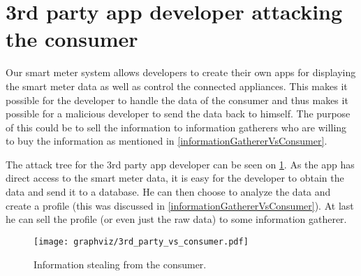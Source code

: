 \section{3rd party app developer attacking the consumer}
Our smart meter system allows developers to create their own apps for displaying the smart meter data as well as control the connected appliances.
This makes it possible for the developer to handle the data of the consumer and thus makes it possible for a malicious developer to send the data back to himself.
The purpose of this could be to sell the information to information gatherers who are willing to buy the information as mentioned in \cref{informationGathererVsConsumer}.

The attack tree for the 3rd party app developer can be seen on \cref{information_stealing_tree}.
As the app has direct access to the smart meter data, it is easy for the developer to obtain the data and send it to a database.
He can then choose to analyze the data and create a profile (this was discussed in \cref{informationGathererVsConsumer}).
At last he can sell the profile (or even just the raw data) to some information gatherer.

\begin{figure}
  \begin{center}
    \texttt{[image: graphviz/3rd\_party\_vs\_consumer.pdf]}
  \end{center}
  \caption{Information stealing from the consumer.}
  \label{information_stealing_tree}
\end{figure}